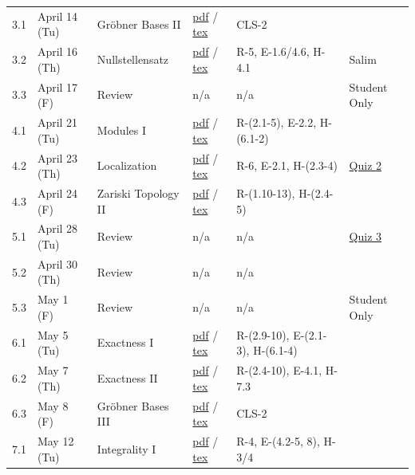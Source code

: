 \documentclass[11pt,letterpaper]{article}
\begin{document}
\begin{longtable}{L{25pt}L{69pt}L{106pt}L{65pt}L{136pt}L{55pt}}
3.1 & April 14 (Tu) & Gröbner Bases II & \href{https://www.juliettebruce.xyz/teaching/121S26/3-1.pdf}{pdf} / \href{https://www.juliettebruce.xyz/teaching/121S26/3-1.tex}{tex} & CLS-2 &  \\
3.2 & April 16 (Th) & Nullstellensatz & \href{https://www.juliettebruce.xyz/teaching/121S26/3-2.pdf}{pdf} / \href{https://www.juliettebruce.xyz/teaching/121S26/3-2.tex}{tex} & R-5, E-1.6/4.6, H-4.1 & Salim \\
3.3 & April 17 (F) & Review & n/a & n/a & Student Only \\
4.1 & April 21 (Tu) & Modules I & \href{https://www.juliettebruce.xyz/teaching/121S26/4-1.pdf}{pdf} / \href{https://www.juliettebruce.xyz/teaching/121S26/4-1.tex}{tex} & R-(2.1-5), E-2.2, H-(6.1-2) &  \\
4.2 & April 23 (Th) & Localization & \href{https://www.juliettebruce.xyz/teaching/121S26/4-2.pdf}{pdf} / \href{https://www.juliettebruce.xyz/teaching/121S26/4-2.tex}{tex} & R-6, E-2.1, H-(2.3-4) & \href{https://www.juliettebruce.xyz/teaching/121S26/quiz2.pdf}{Quiz 2} \\
4.3 & April 24 (F) & Zariski Topology II & \href{https://www.juliettebruce.xyz/teaching/121S26/4-3.pdf}{pdf} / \href{https://www.juliettebruce.xyz/teaching/121S26/4-3.tex}{tex} & R-(1.10-13), H-(2.4-5) &  \\
5.1 & April 28 (Tu) & Review & n/a & n/a & \href{https://www.juliettebruce.xyz/teaching/121S26/quiz3.pdf}{Quiz 3} \\
5.2 & April 30 (Th) & Review & n/a & n/a &  \\
5.3 & May 1 (F) & Review & n/a & n/a & Student Only \\
6.1 & May 5 (Tu) & Exactness I & \href{https://www.juliettebruce.xyz/teaching/121S26/6-1.pdf}{pdf} / \href{https://www.juliettebruce.xyz/teaching/121S26/6-1.tex}{tex} & R-(2.9-10), E-(2.1-3), H-(6.1-4) &  \\
6.2 & May 7 (Th) & Exactness II & \href{https://www.juliettebruce.xyz/teaching/121S26/6-2.pdf}{pdf} / \href{https://www.juliettebruce.xyz/teaching/121S26/6-2.tex}{tex} & R-(2.4-10), E-4.1, H-7.3 &  \\
6.3 & May 8 (F) & Gröbner Bases III & \href{https://www.juliettebruce.xyz/teaching/121S26/6-3.pdf}{pdf} / \href{https://www.juliettebruce.xyz/teaching/121S26/6-3.tex}{tex} & CLS-2 &  \\
7.1 & May 12 (Tu) & Integrality I & \href{https://www.juliettebruce.xyz/teaching/121S26/7-1.pdf}{pdf} / \href{https://www.juliettebruce.xyz/teaching/121S26/7-1.tex}{tex} & R-4, E-(4.2-5, 8), H-3/4 &  \\

\end{longtable}
\end{document}
